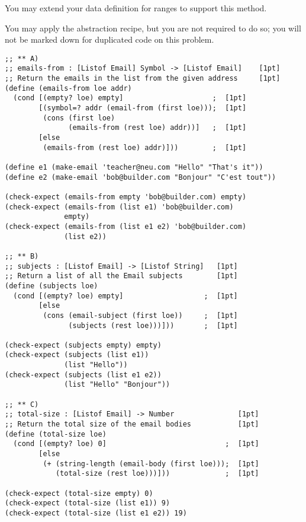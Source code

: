 \documentclass[12pt]{article}                   %
\newenvironment{solution}{}{}
\begin{document}
\begin{problem}
\begin{enumerate}
  You may extend your data definition for ranges to
  support this method.

  You may apply the abstraction recipe, but you are not required to do
  so; you will not be marked down for duplicated code on this problem.
\end{enumerate}

\newpage
\ifrubric{}
\newpage
\fi

\begin{solution}
\begin{verbatim}
;; ** A)
;; emails-from : [Listof Email] Symbol -> [Listof Email]    [1pt]
;; Return the emails in the list from the given address     [1pt]
(define (emails-from loe addr)
  (cond [(empty? loe) empty]                     ;  [1pt]
        [(symbol=? addr (email-from (first loe)));  [1pt]
         (cons (first loe)
               (emails-from (rest loe) addr))]   ;  [1pt]
        [else
         (emails-from (rest loe) addr)]))        ;  [1pt]

(define e1 (make-email 'teacher@neu.com "Hello" "That's it"))
(define e2 (make-email 'bob@builder.com "Bonjour" "C'est tout"))

(check-expect (emails-from empty 'bob@builder.com) empty)
(check-expect (emails-from (list e1) 'bob@builder.com)
              empty)
(check-expect (emails-from (list e1 e2) 'bob@builder.com)
              (list e2))

;; ** B)
;; subjects : [Listof Email] -> [Listof String]   [1pt]
;; Return a list of all the Email subjects        [1pt]
(define (subjects loe)
  (cond [(empty? loe) empty]                   ;  [1pt]
        [else
         (cons (email-subject (first loe))     ;  [1pt]
               (subjects (rest loe)))]))       ;  [1pt]

(check-expect (subjects empty) empty)
(check-expect (subjects (list e1))
              (list "Hello"))
(check-expect (subjects (list e1 e2))
              (list "Hello" "Bonjour"))

;; ** C)
;; total-size : [Listof Email] -> Number               [1pt]
;; Return the total size of the email bodies           [1pt]
(define (total-size loe)
  (cond [(empty? loe) 0]                            ;  [1pt]
        [else
         (+ (string-length (email-body (first loe)));  [1pt]
            (total-size (rest loe)))]))             ;  [1pt]

(check-expect (total-size empty) 0)
(check-expect (total-size (list e1)) 9)
(check-expect (total-size (list e1 e2)) 19)
\end{verbatim}
\end{solution}
\end{problem}
\ifrubric\bigskip\else
\newpage
\fi
\end{document}
